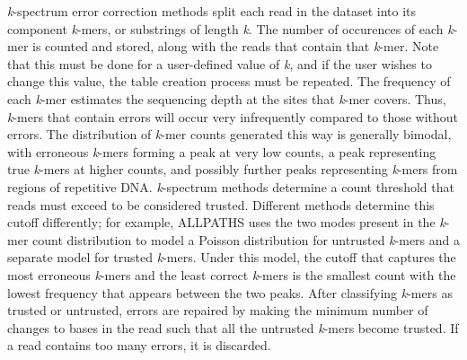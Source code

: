 \textit{k}-spectrum error correction methods split each read in the dataset into its component \textit{k}-mers, or substrings of length \textit{k}. The number of occurences of each \textit{k}-mer is counted and stored, along with the reads that contain that \textit{k}-mer. Note that this must be done for a user-defined value of \textit{k}, and if the user wishes to change this value, the table creation process must be repeated.
The frequency of each \textit{k}-mer estimates the sequencing depth at the sites that \textit{k}-mer covers. Thus, \textit{k}-mers that contain errors will occur very infrequently compared to those without errors.
The distribution of \textit{k}-mer counts generated this way is generally bimodal, with erroneous \textit{k}-mers forming a peak at very low counts, a peak representing true \textit{k}-mers at higher counts, and possibly further peaks representing \textit{k}-mers from regions of repetitive DNA. \textit{k}-spectrum methods determine a count threshold that reads must exceed to be considered trusted.
Different methods determine this cutoff differently; for example,
ALLPATHS \parencite{butler_allpaths:_2008} uses the two modes present in the \textit{k}-mer count distribution to model a Poisson distribution for untrusted \textit{k}-mers and a separate model for trusted \textit{k}-mers. Under this model, the cutoff that captures the most erroneous \textit{k}-mers and the least correct \textit{k}-mers is the smallest count with the lowest frequency that appears between the two peaks.
After classifying \textit{k}-mers as trusted or untrusted,
errors are repaired by making the minimum number of changes to bases in the read such that all the untrusted \textit{k}-mers become trusted. If a read contains too many errors, it is discarded.

